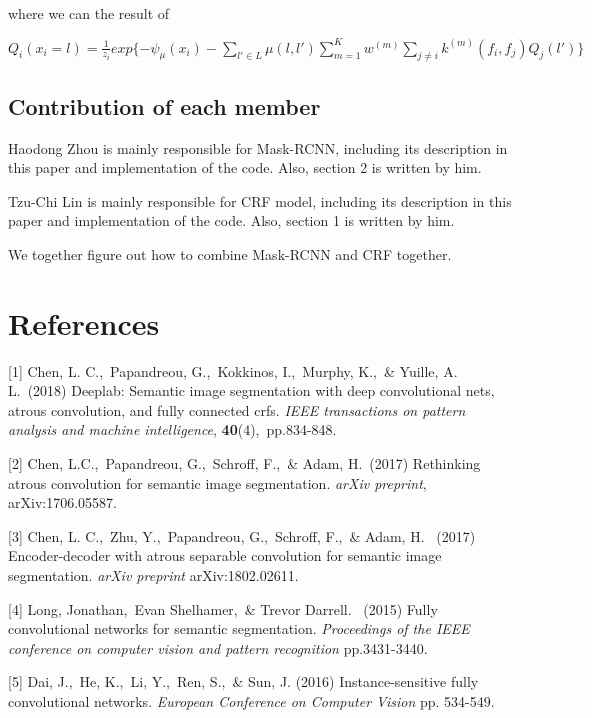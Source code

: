 \documentclass{article}
\begin{document}
where we can the result of 

\begin{center}
$Q_{i}(x_{i}=l)=\frac{1}{z_{i}}exp\{-\psi_{\mu}(x_{i})-\sum_{l'\in L}\mu(l,l')\sum\limits_{m=1}^K w^{(m)}\sum_{j\neq i}k^{(m)}(f_{i},f_{j})Q_{j}(l')\}$
\end{center}

\subsection{Contribution of each member}

Haodong Zhou is mainly responsible for Mask-RCNN, including its description in this paper and implementation of the code. Also, section 2 is written by him.

Tzu-Chi Lin is mainly responsible for CRF model, including its description in this paper and implementation of the code. Also, section 1 is written by him.

We together figure out how to combine Mask-RCNN and CRF together.

\section*{References}

\small

[1] Chen, L. C.,\  Papandreou, G.,\  Kokkinos, I.,\  Murphy, K.,\  
\& Yuille, A. L.\  (2018) Deeplab: Semantic image segmentation with deep convolutional nets, atrous convolution, and fully connected crfs. {\it IEEE transactions on pattern analysis and machine intelligence}, {\bf 40}(4),\  pp.834-848.

[2] Chen, L.C.,\  Papandreou, G.,\  Schroff, F.,\  \& Adam, H.\  (2017) Rethinking atrous convolution for semantic image segmentation. {\it arXiv preprint},  arXiv:1706.05587.

[3] Chen, L. C.,\  Zhu, Y.,\  Papandreou, G.,\  Schroff, F.,\  \& Adam, H. \ (2017) Encoder-decoder with atrous separable convolution for semantic image segmentation. {\it arXiv preprint} arXiv:1802.02611.

[4] Long, Jonathan,\ Evan Shelhamer,\  \& Trevor Darrell. \  (2015) Fully convolutional networks for semantic segmentation. {\it Proceedings of the IEEE conference on computer vision and pattern recognition} pp.3431-3440.

[5] Dai, J.,\  He, K.,\  Li, Y.,\  Ren, S.,\  \& Sun, J. (2016) Instance-sensitive fully convolutional networks. {\it European Conference on Computer Vision} pp. 534-549.
\end{document}
